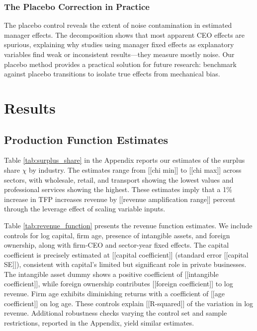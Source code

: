\documentclass[11pt,a4paper]{article}
\begin{document}
\subsubsection{The Placebo Correction in Practice}

The placebo control reveals the extent of noise contamination in estimated manager effects. The decomposition shows that most apparent CEO effects are spurious, explaining why studies using manager fixed effects as explanatory variables find weak or inconsistent results—they measure mostly noise. Our placebo method provides a practical solution for future research: benchmark against placebo transitions to isolate true effects from mechanical bias.

\section{Results}

\subsection{Production Function Estimates}

Table \ref{tab:surplus_share} in the Appendix reports our estimates of the surplus share $\chi$ by industry. The estimates range from [[chi min]] to [[chi max]] across sectors, with wholesale, retail, and transport showing the lowest values and professional services showing the highest. These estimates imply that a 1\% increase in TFP increases revenue by [[revenue amplification range]] percent through the leverage effect of scaling variable inputs.

Table \ref{tab:revenue_function} presents the revenue function estimates. We include controls for log capital, firm age, presence of intangible assets, and foreign ownership, along with firm-CEO and sector-year fixed effects. The capital coefficient is precisely estimated at [[capital coefficient]] (standard error [[capital SE]]), consistent with capital's limited but significant role in private businesses. The intangible asset dummy shows a positive coefficient of [[intangible coefficient]], while foreign ownership contributes [[foreign coefficient]] to log revenue. Firm age exhibits diminishing returns with a coefficient of [[age coefficient]] on log age. These controls explain [[R-squared]] of the variation in log revenue. Additional robustness checks varying the control set and sample restrictions, reported in the Appendix, yield similar estimates.
\end{document}
